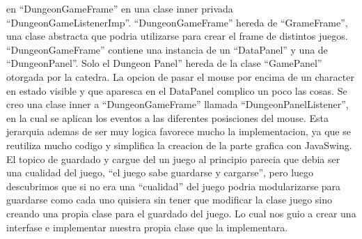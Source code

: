 \documentclass[a4paper,14.5pt]{article}
\begin{document}
en “DungeonGameFrame” en una clase inner privada “DungeonGameListenerImp”. “DungeonGameFrame” 
hereda de “GrameFrame”, una clase abstracta que podria utilizarse para crear el frame de distintos 
juegos. “DungeonGameFrame” contiene una instancia de un “DataPanel” y una de “DungeonPanel”. Solo el 
Dungeon Panel” hereda de la clase “GamePanel” otorgada por la catedra. La opcion de pasar el mouse por 
encima de un character en estado visible y que aparesca en el DataPanel complico un poco las cosas. Se 
creo una clase inner a “DungeonGameFrame” llamada “DungeonPanelListener”, en la cual se aplican los eventos 
a las diferentes posisciones del mouse. Esta jerarquia ademas de ser muy logica favorece mucho la implementacion, 
ya que se reutiliza mucho codigo y simplifica la creacion de la parte grafica con JavaSwing.
El topico de guardado y cargue del un juego al principio parecia que debia ser una cualidad del juego, “el juego 
sabe guardarse y cargarse”, pero luego descubrimos que si no era una “cualidad” del juego podria modularizarse 
para guardarse como cada uno quisiera sin tener que modificar la clase juego sino creando una propia clase para
 el guardado del juego. Lo cual nos guio a crear una interfase e implementar nuestra propia clase que la implementara.
\end{document}
